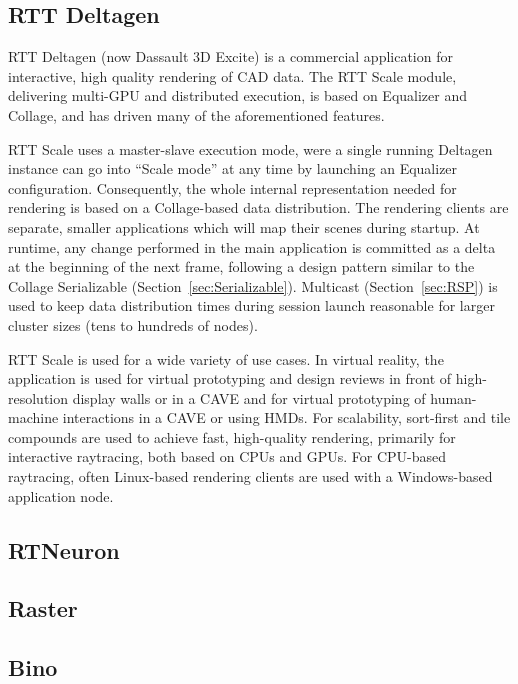 \documentclass[10pt,journal,compsoc]{IEEEtran}
\newcommand{\sref}[1]{Section~\ref{#1}}
\begin{document}
\subsection{RTT Deltagen}

RTT Deltagen (now Dassault 3D Excite) is a commercial application for
interactive, high quality rendering of CAD data. The RTT Scale module,
delivering multi-GPU and distributed execution, is based on Equalizer and
Collage, and has driven many of the aforementioned features.

RTT Scale uses a master-slave execution mode, were a single running Deltagen
instance can go into ``Scale mode'' at any time by launching an Equalizer
configuration. Consequently, the whole internal representation needed for
rendering is based on a Collage-based data distribution. The rendering clients
are separate, smaller applications which will map their scenes during
startup. At runtime, any change performed in the main application is committed
as a delta at the beginning of the next frame, following a design pattern
similar to the Collage \textsf{Serializable}
(\sref{sec:Serializable}). Multicast (\sref{sec:RSP}) is used to keep data
distribution times during session launch reasonable for larger cluster sizes
(tens to hundreds of nodes).

RTT Scale is used for a wide variety of use cases. In virtual reality, the
application is used for virtual prototyping and design reviews in front of
high-resolution display walls or in a CAVE and for virtual prototyping of
human-machine interactions in a CAVE or using HMDs. For scalability, sort-first
and tile compounds are used to achieve fast, high-quality rendering, primarily
for interactive raytracing, both based on CPUs and GPUs. For CPU-based
raytracing, often Linux-based rendering clients are used with a Windows-based
application node.

\subsection{RTNeuron}
\cite{HBBES:13}

\subsection{Raster}

\subsection{Bino}
\end{document}
